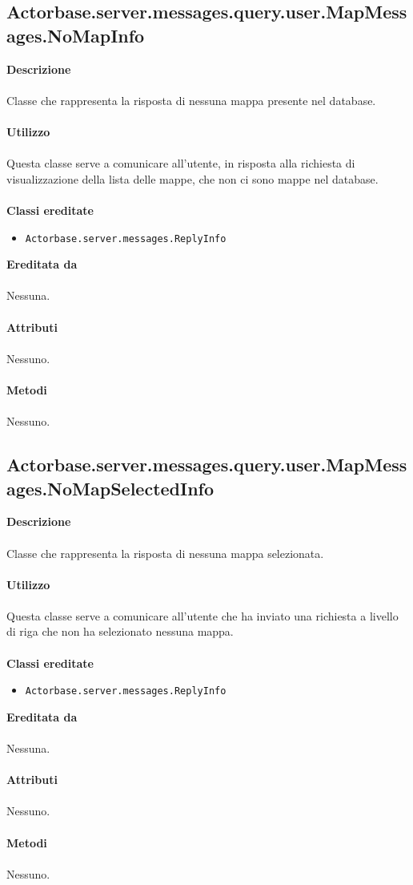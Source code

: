 \documentclass[a4paper]{article}
\begin{document}
	\subsection{Actorbase.server.messages.query.user.MapMessages.NoMapInfo}
		\textbf{Descrizione}
			\\ \\
		Classe che rappresenta la risposta di nessuna mappa presente nel database.
			\\ \\
		\textbf{Utilizzo}
			\\ \\
		Questa classe serve a comunicare all'utente, in risposta alla richiesta di visualizzazione della lista delle mappe, che non ci sono mappe nel database.
			\\ \\
		\textbf{Classi ereditate}
			\begin{itemize}
				\item \texttt{Actorbase.server.messages.ReplyInfo }
			\end{itemize}
		\textbf{Ereditata da}
			\\ \\
			Nessuna.
			\\ \\
		\textbf{Attributi}
			\\ \\
			Nessuno.
			\\ \\
		\textbf{Metodi }
			\\ \\
			Nessuno.
			
	\subsection{Actorbase.server.messages.query.user.MapMessages.NoMapSelectedInfo}
		\textbf{Descrizione}
			\\ \\
		Classe che rappresenta la risposta di nessuna mappa selezionata.
			\\ \\
		\textbf{Utilizzo}
			\\ \\
		Questa classe serve a comunicare all'utente che ha inviato una richiesta a livello di riga che non ha selezionato nessuna mappa.
			\\ \\
		\textbf{Classi ereditate}
			\begin{itemize}
				\item \texttt{Actorbase.server.messages.ReplyInfo }
			\end{itemize}
		\textbf{Ereditata da}
			\\ \\
			Nessuna.
			\\ \\
		\textbf{Attributi}
			\\ \\
			Nessuno.
			\\ \\
		\textbf{Metodi }
			\\ \\
			Nessuno.
			
\end{document}
